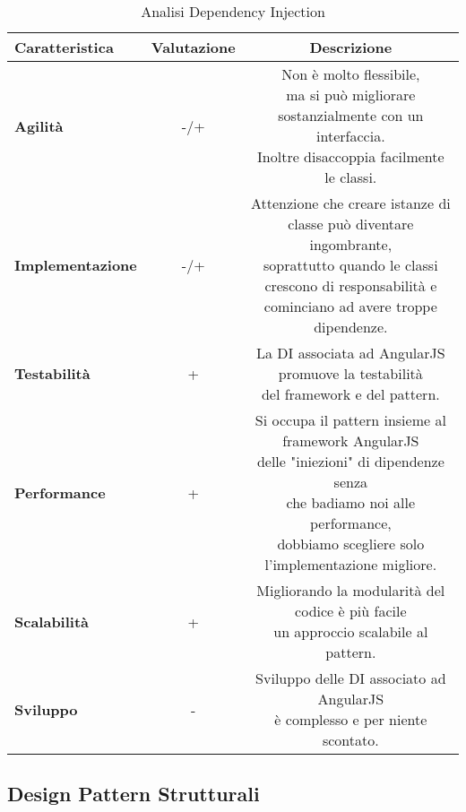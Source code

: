 {{{\begin{itemize}
				\small %
				{\renewcommand\arraystretch{1.2} %
					\begin{center} \begin{table} \begin{tabular}{|l|c|c|}
						\hline
						{\textbf{Caratteristica}}&{\textbf{Valutazione}}&{\textbf{Descrizione}}\\
						\hline
						\textbf{Agilità} & -/+ &  \minitab[c]{Non è molto flessibile,\\ ma si può migliorare sostanzialmente con un interfaccia.\\Inoltre disaccoppia facilmente le classi.} \\
						\hline
						\textbf{Implementazione} & -/+ &  \minitab[c]{Attenzione che creare istanze di classe può diventare ingombrante,\\ soprattutto quando le classi\\ crescono di responsabilità e cominciano ad avere troppe dipendenze.} \\
						\hline
						\textbf{Testabilità} & + &  \minitab[c]{La DI associata ad AngularJS promuove la testabilità\\del framework e del pattern.}\\
						\hline
						\textbf{Performance} & + &  \minitab[c]{Si occupa il pattern insieme al framework AngularJS\\delle "iniezioni" di dipendenze senza\\che badiamo noi alle performance,\\dobbiamo scegliere solo l'implementazione migliore.} \\
						\hline
						\textbf{Scalabilità} & + &  \minitab[c]{Migliorando la modularità del codice è più facile\\un approccio scalabile al pattern.}\\
						\hline
						\textbf{Sviluppo} & - &  \minitab[c]{Sviluppo delle DI associato ad AngularJS\\ è complesso e per niente scontato.}\\
						\hline
					\end{tabular}
				\caption{Analisi Dependency Injection}
				\label{ADI}
				\end{table}	
			 \end{center}
				}
			\end{itemize}
		}	
	}
	\subsection{Design Pattern Strutturali}{
}}
